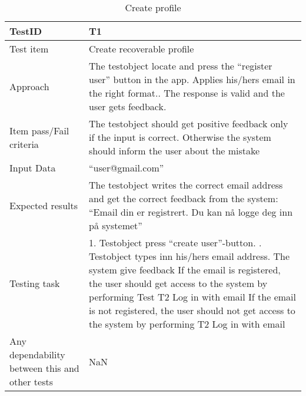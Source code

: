 \begin{table}[!h]
	\begin{center}
		\begin{tabular}{| p{5cm} | p{12cm} |}
			\hline
			TestID & T1 \\ \hline
			Test item & Create recoverable profile  \\ \hline
			Approach & The testobject locate and press the “register user” button in the app. Applies his/hers email in the right format.. The response is valid and the user gets feedback.  \\ \hline
			Item pass/Fail criteria & The testobject should get positive feedback only if the input is correct. Otherwise the system should inform the user about the mistake  \\ \hline
			Input Data & “user@gmail.com”  \\ \hline
			Expected results & The testobject writes the correct email address and get the correct feedback from the system: “Email din er registrert. Du kan nå logge deg inn på systemet”   \\ \hline
			Testing task & 1. Testobject press “create user”-button. \newline 2. Testobject types inn his/hers email address\newline
			3. The system give feedback \newline 4.1 If the email is registered, the user should get access to the system by        performing Test T2 Log in with email\newline 4.2 If the email is not registered, the user should not get access to the system by performing T2 Log in with email  \\ \hline
			Any dependability between this and other tests & NaN  \\ \hline
		\end{tabular}
	\end{center}
	\caption{Create profile}
	\label{Tab:systemtest1}
\end{table}

